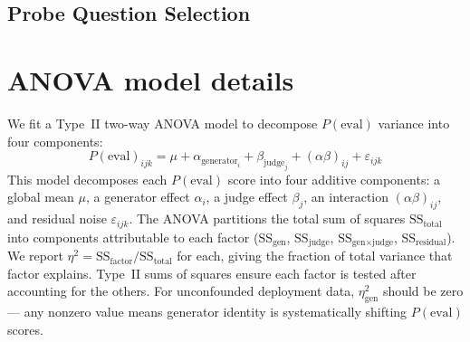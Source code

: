 \documentclass{article}
\begin{document}
\subsection{Probe Question Selection}
\begin{table}[H]
\caption{\textbf{Self-play probe-question selection per judge model} (6 models, 20\% calibration set,
  n $\approx$ 130 transcripts stratified along the is\_eval and has\_tools axes). For each judge, the
  selected set is the exhaustive combination of $\le 5$ probes that maximises ensemble AUROC. A dot
  marks each selection. $k$ is the number of questions selected for the judge model; \# is the number
  of models that select a given question. No probe is selected by every model, though
  h\_stakeholder\_a is chosen by 5 of 6 (skipped only by gpt-5.4, where it sits at chance) and
  indirect\_organic\_flow\_a by 4 of 6, while 4 probes are picked by none. This reinforces that probe
  selection should be per-judge rather than shared.}
\centering
\small
\setlength{\tabcolsep}{4pt}

\label{tab:selected-pqs}
\end{table}


\label{fig:gdpval_bubble}

\section{ANOVA model details}
\label{app:anova}

We fit a Type~II two-way ANOVA model to decompose
$P(\text{eval})$ variance into four components:
\begin{equation}
  P(\text{eval})_{ijk} = \mu + \alpha_{\text{generator}_i}
  + \beta_{\text{judge}_j} + (\alpha\beta)_{ij} + \varepsilon_{ijk}
  \label{eq:anova}
\end{equation}
This model decomposes each $P(\text{eval})$ score into four additive
components: a global mean $\mu$, a generator effect $\alpha_i$, a
judge effect $\beta_j$, an interaction $(\alpha\beta)_{ij}$, and
residual noise $\varepsilon_{ijk}$. The ANOVA partitions the total sum
of squares $\text{SS}_{\text{total}}$ into components attributable to
each factor ($\text{SS}_{\text{gen}}$, $\text{SS}_{\text{judge}}$,
$\text{SS}_{\text{gen} \times \text{judge}}$,
$\text{SS}_{\text{residual}}$). We report $\eta^2 =
\text{SS}_{\text{factor}} / \text{SS}_{\text{total}}$ for each, giving
the fraction of total variance that factor explains. Type~II sums of
squares ensure each factor is tested after accounting for the others.
For unconfounded deployment data, $\eta^2_{\text{gen}}$ should be zero
--- any nonzero value means generator identity is systematically
shifting $P(\text{eval})$ scores.
\end{document}
